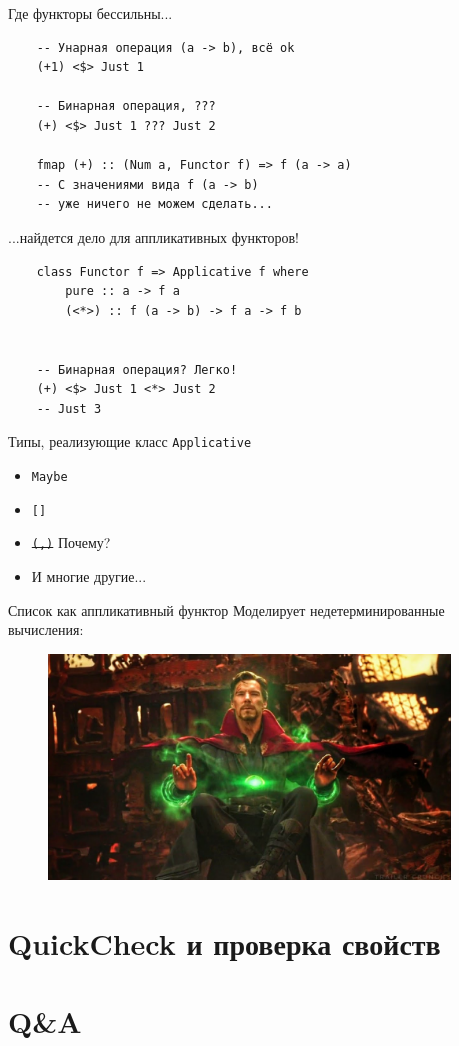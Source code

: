 \documentclass{beamer}
\begin{document}
  \begin{frame}[fragile]{Где функторы бессильны...}
     \begin{verbatim}
    -- Унарная операция (a -> b), всё ok
    (+1) <$> Just 1
    
    -- Бинарная операция, ???
    (+) <$> Just 1 ??? Just 2
    
    fmap (+) :: (Num a, Functor f) => f (a -> a)
    -- С значениями вида f (a -> b)
    -- уже ничего не можем сделать...
     \end{verbatim}
  \end{frame}
  \begin{frame}[fragile]{...найдется дело для аппликативных функторов!}
      \begin{verbatim}
    class Functor f => Applicative f where
        pure :: a -> f a
        (<*>) :: f (a -> b) -> f a -> f b
        
    
    -- Бинарная операция? Легко!
    (+) <$> Just 1 <*> Just 2
    -- Just 3
      \end{verbatim}
  \end{frame}
  \begin{frame}{Типы, реализующие класс \texttt{Applicative}}
      \begin{itemize}
          \item \texttt{Maybe}
          \item \texttt{[]}
          \item \st{\texttt{(,)}} \alert{Почему?}
          \item И многие другие...
      \end{itemize}
  \end{frame}
  \begin{frame}{Список как аппликативный функтор}
      Моделирует недетерминированные вычисления:
      \begin{figure}
          \centering
          \includegraphics[width=0.95\textwidth]{media/dr-strange.jpg}
      \end{figure}
  \end{frame}
  \section{QuickCheck и проверка свойств}
  \section{Q\&A}
\end{document}
